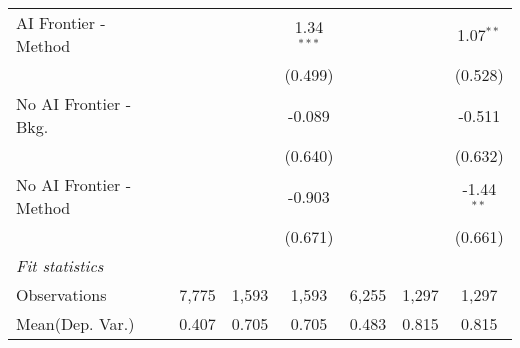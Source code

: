 \begin{tabular}{lcccccc}
   AI Frontier - Method    &                &             & 1.34$^{***}$ &                &              & 1.07$^{**}$\\   
                           &                &             & (0.499)      &                &              & (0.528)\\   
   No AI Frontier - Bkg.   &                &             & -0.089       &                &              & -0.511\\   
                           &                &             & (0.640)      &                &              & (0.632)\\   
   No AI Frontier - Method &                &             & -0.903       &                &              & -1.44$^{**}$\\   
                           &                &             & (0.671)      &                &              & (0.661)\\   
   \midrule
   \emph{Fit statistics}\\
   Observations            & 7,775          & 1,593       & 1,593        & 6,255          & 1,297        & 1,297\\  
Mean(Dep. Var.) & 0.407 & 0.705 & 0.705 & 0.483 & 0.815 & 0.815 \\
   

\end{tabular}
